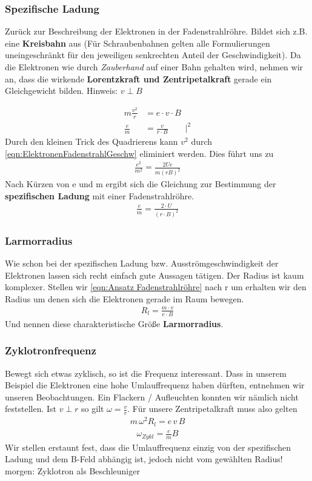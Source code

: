 \subsubsection{Spezifische Ladung}
Zurück zur Beschreibung der Elektronen in der Fadenstrahlröhre. Bildet sich z.B. eine \textbf{Kreisbahn} aus (Für Schraubenbahnen gelten alle Formulierungen uneingeschränkt für den jeweiligen senkrechten Anteil der Geschwindigkeit).
Da die Elektronen wie durch \textit{Zauberhand} auf einer Bahn gehalten wird, nehmen wir an, dass die wirkende \textbf{Lorentzkraft und Zentripetalkraft} gerade ein Gleichgewicht bilden. Hinweis: $v \perp B$

\begin{align} \label{eqn:Ansatz Fadenstrahlröhre}
m \frac{v^2}{r} 	&= e \cdot v \cdot B \\ 
\frac{e}{m}			&= \frac{v}{r \cdot B} \qquad  \bigg|^2
\end{align}Durch den kleinen Trick des Quadrierens  kann $v^2$ durch \ref{eqn:ElektronenFadenstrahlGeschw} eliminiert werden. Dies führt uns zu 
\begin{align*}
\frac{e^2}{m^2} = \frac{2Ue}{m(rB)^2}
\end{align*}Nach Kürzen von e und m ergibt sich die Gleichung zur Bestimmung der \textbf{spezifischen Ladung} mit einer Fadenstrahlröhre.
\begin{align} \label{eqn:spezifischeLadung}
\boxed{\frac{e}{m} = \frac{2 \cdot U }{\left(r \cdot B \right)^2}}
\end{align}
\subsubsection{Larmorradius}
Wie schon bei der spezifischen Ladung bzw. Ausströmgeschwindigkeit der Elektronen lassen sich recht einfach gute Aussagen tätigen.  Der Radius ist kaum komplexer. 
Stellen wir \ref{eqn:Ansatz Fadenstrahlröhre} nach r um erhalten wir den Radius um denen sich die Elektronen gerade im Raum bewegen.
\begin{align} \label{eqn:Larmorradius}
\boxed{R_l = \frac{m \cdot v}{e \cdot B}}
\end{align} Und nennen diese charakteristische Größe \textbf{Larmorradius}. 

\subsubsection{Zyklotronfrequenz}
Bewegt sich etwas zyklisch, so ist die Frequenz interessant. Dass in unserem Beispiel die Elektronen eine hohe Umlauffrequenz haben dürften, entnehmen wir unseren Beobachtungen. Ein Flackern / Aufleuchten konnten wir nämlich nicht feststellen. 
Ist $v \perp r$ so gilt $\omega = \frac{v}{r}$. Für unsere Zentripetalkraft muss also gelten
\begin{align*}
m \, \omega^2 R_l = e \, v \, B
\end{align*}
\begin{align} \label{eqn:Zyklotronfrequenz}
\boxed{\omega_{Zykl} = \frac{e}{m} B}
\end{align}Wir stellen erstaunt fest, dass die Umlauffrequenz einzig von der spezifischen Ladung und dem B-Feld abhängig ist, jedoch nicht vom gewählten Radius!
morgen: Zyklotron als Beschleuniger 

